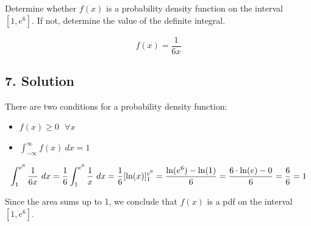 \documentclass[]{article}
\providecommand{\tightlist}{%
  \setlength{\itemsep}{0pt}\setlength{\parskip}{0pt}}
\begin{document}
Determine whether \(f(x)\) is a probability density function on the
interval \([1, e^6]\). If not, determine the value of the definite
integral.

\[
f(x) = \frac{1}{6x}
\]

\subsection{7. Solution}\label{solution-6}

There are two conditions for a probability density function:

\begin{itemize}
\tightlist
\item
  \(f(x) \geq 0 \ \ \ \forall x\)
\item
  \(\int_{-\infty}^{\infty}f(x) \ dx = 1\)
\end{itemize}

\[
\int_{1}^{e^6} \frac{1}{6x} \ dx = \frac{1}{6} \int_{1}^{e^6}\frac{1}{x} \ dx \\
= \frac{1}{6}[\ln(x)]_{1}^{e^6} \\
= \frac{\ln(e^6) - \ln(1)}{6} = \frac{6\cdot \ln(e) - 0}{6} = \frac{6}{6} = 1
\]

Since the area sums up to 1, we conclude that \(f(x)\) is a pdf on the
interval \([1, e^6]\).
\end{document}
